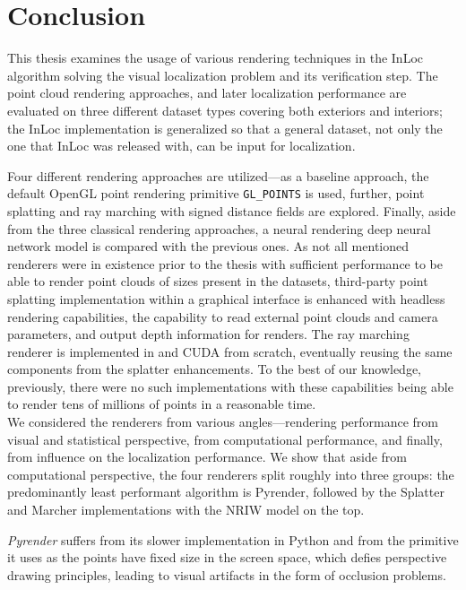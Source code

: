 \chapter*{Conclusion} \label{chap:conclusion}

This thesis examines the usage of various rendering techniques in the InLoc
algorithm solving the visual localization problem and its verification step.
The point cloud rendering approaches, and later localization performance are
evaluated on three different dataset types covering both exteriors and
interiors; the InLoc implementation is generalized so that a general dataset,
not only the one that InLoc was released with, can be input for localization.

Four different rendering approaches are utilized---as a baseline approach,
the default OpenGL point rendering primitive \verb|GL_POINTS| is used, further,
point splatting and ray marching with signed distance fields are explored.
Finally, aside from the three classical rendering approaches, a neural
rendering deep neural network model is compared with the previous ones. As not
all mentioned renderers were in existence prior to the thesis with sufficient
performance to be able to render point clouds of sizes present in the datasets,
third-party point splatting \CC{} implementation within a graphical interface is
enhanced with headless rendering capabilities, the capability to read external point
clouds and camera parameters, and output depth information for renders. The ray
marching renderer is implemented in \CC{} and CUDA from scratch, eventually
reusing the same components from the splatter enhancements. To the best of our knowledge,
previously, there were no such implementations with these capabilities being able
to render tens of millions of points in a reasonable time.\\

We considered the renderers from various angles---rendering performance from visual
and statistical perspective, from computational performance, and finally, from
influence on the localization performance. We show that aside from computational
perspective, the four renderers split roughly into three groups: the predominantly
least performant algorithm is Pyrender, followed by the Splatter and Marcher
implementations with the NRIW model on the top.

\emph{Pyrender} suffers from its slower
implementation in Python and from the primitive it uses as the points have fixed
size in the screen space, which defies perspective drawing principles, leading to
visual artifacts in the form of occlusion problems.

